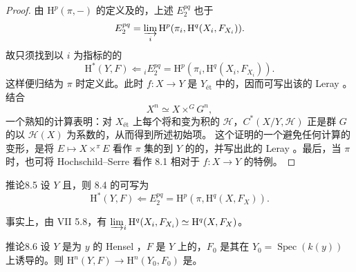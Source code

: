 \begin{proof}
由 $\mathrm H^p(\pi,-)$ 的定义及的，上述 $E_2^{pq}$ 也于
\[E_2^{pq}=\varinjlim_i\mathrm H^p(\pi_i,\mathrm H^q(X_i,F_{X_i})).\]
故只须找到以 $i$ 为指标的的
\[\mathrm H^*(Y,F)\Longleftarrow {}_iE_2^{pq}=\mathrm H^p(\pi_i,\mathrm H^q(X_i,F_{X_i})).\]
这样便归结为 $\pi$ 时定义此。此时 $f:X\to Y$ 是 $Y_{\text{ét}}$ 中的，因而可写出该的 Leray 。结合
\[X^n\simeq X\mathbin{\times^{G}}G^n,\]
一个熟知的计算表明：对 $X_{\text{ét}}$ 上每个将和变为积的 $\mathscr H$，$C^*(X/Y,\mathscr H)$ 正是群 $G$ 的以 $\mathscr H(X)$ 为系数的，从而得到所述初始项。
这个证明的一个避免任何计算的变形，是将 $E\mapsto X\times^\pi E$ 看作 $\pi$ 集的到 $Y$ 的的，并写出此的 Leray 。最后，当 $\pi$ 时，也可将 Hochschild--Serre 看作 8.1 相对于 $f:X\to Y$ 的特例。
\end{proof}
\begin{SGAresult}{推论}{8.5}
设 $Y$ 且，则 8.4 的可写为
\[\mathrm H^*(Y,F)\Longleftarrow E_2^{pq}=\mathrm H^p(\pi,\mathrm H^q(X,F_X)).\]
\end{SGAresult}
事实上，由 VII 5.8，有 $\varinjlim_i\mathrm H^q(X_i,F_{X_i})\simeq\mathrm H^q(X,F_X)$。
\begin{SGAresult}{推论}{8.6}
设 $Y$ 是为 $y$ 的 Hensel ，$F$ 是 $Y$ 上的，$F_0$ 是其在 $Y_0=\operatorname{Spec}(k(y))$ 上诱导的。则 $\mathrm H^n(Y,F)\to\mathrm H^n(Y_0,F_0)$ 是。
\end{SGAresult}
